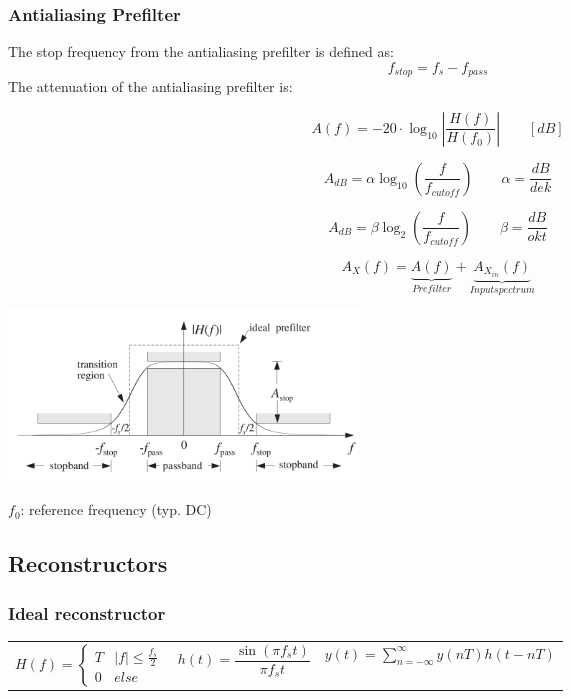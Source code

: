 \subsubsection{Antialiasing Prefilter }
The stop frequency from the antialiasing prefilter is defined as:
\[ f_{stop} = f_s - f_{pass} \]
The attenuation of the antialiasing prefilter is:
\begin{multicols}{2}

\[ A(f) = -20 \cdot \log_{10}{\left|\frac{H(f)}{H(f_0)}\right|} \qquad [dB] \]

\[ A_{dB} = \alpha \log_{10}(\frac{f}{f_{cutoff}}) \qquad \alpha = \frac{dB}{dek} \]

\[ A_{dB} = \beta \log_{2}(\frac{f}{f_{cutoff}}) \qquad \beta = \frac{dB}{okt} \]

\[ A_{X}(f) = \underbrace{A(f)}_{Prefilter} + \underbrace{A_{X_{in}}(f)}_{Input spectrum} \]

\columnbreak

 \includegraphics[width=9.5cm]{./picture/antialiasing_prefilter}

\end{multicols}

$f_0$: reference frequency (typ. DC)

\subsection{Reconstructors }
\subsubsection{Ideal reconstructor }
  \begin{tabular}{p{5cm}p{4cm}p{6cm}}
	  $H(f) = \left\lbrace \begin{matrix}
	    T & |f| \leq \frac{f_s}{2} \\
	    0 & else
	  \end{matrix}\right.$ & 
    $h(t) = \dfrac{\sin(\pi f_s t)}{\pi f_s t}$ &
    $y(t) = \sum\limits_{n=-\infty}^\infty y(nT)h(t-nT)$
  \end{tabular}
  

